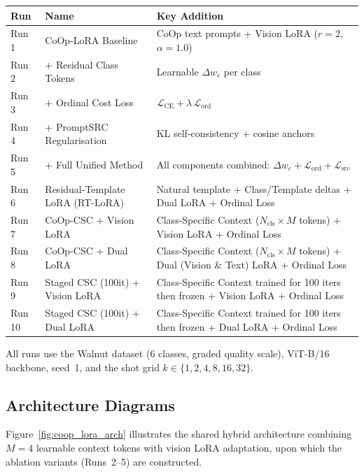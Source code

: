 \documentclass[letterpaper,11pt,leqno]{article}
\begin{document}
\begin{table}[H]
\centering
\begin{tabularx}{\textwidth}{l l X}
\toprule
\textbf{Run} & \textbf{Name} & \textbf{Key Addition} \\
\midrule
Run 1 & CoOp-LoRA Baseline          & CoOp text prompts + Vision LoRA ($r{=}2$, $\alpha{=}1.0$) \\
Run 2 & + Residual Class Tokens     & Learnable $\Delta w_c$ per class \\
Run 3 & + Ordinal Cost Loss         & $\mathcal{L}_\mathrm{CE} + \lambda\,\mathcal{L}_\mathrm{ord}$ \\
Run 4 & + PromptSRC Regularisation  & KL self-consistency + cosine anchors \\
Run 5 & + Full Unified Method       & All components combined: $\Delta w_c + \mathcal{L}_\mathrm{ord} + \mathcal{L}_\mathrm{src}$ \\
Run 6 & Residual-Template LoRA (RT-LoRA) & Natural template + Class/Template deltas + Dual LoRA + Ordinal Loss \\
Run 7 & CoOp-CSC + Vision LoRA      & Class-Specific Context ($N_\text{cls} \times M$ tokens) + Vision LoRA + Ordinal Loss \\
Run 8 & CoOp-CSC + Dual LoRA        & Class-Specific Context ($N_\text{cls} \times M$ tokens) + Dual (Vision \& Text) LoRA + Ordinal Loss \\
Run 9 & Staged CSC (100it) + Vision LoRA & Class-Specific Context trained for 100 iters then frozen + Vision LoRA + Ordinal Loss \\
Run 10 & Staged CSC (100it) + Dual LoRA   & Class-Specific Context trained for 100 iters then frozen + Dual LoRA + Ordinal Loss \\
\bottomrule
\end{tabularx}
\end{table}

All runs use the Walnut dataset (6 classes, graded quality scale), ViT-B/16
backbone, seed~1, and the shot grid $k \in \{1, 2, 4, 8, 16, 32\}$.

\subsection{Architecture Diagrams}

Figure~\ref{fig:coop_lora_arch} illustrates the shared hybrid architecture combining $M{=}4$ learnable context tokens with vision LoRA adaptation, upon which the ablation variants (Runs~2--5) are constructed.
\end{document}
